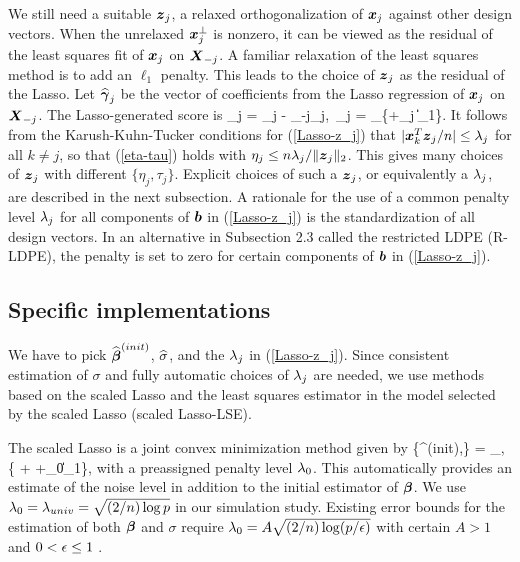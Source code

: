 \documentclass[11pt]{amsart}
\def\argmin{\mathop{\rm arg\, min}}
\begin{document}
We still need a suitable $\boldsymbol{z}_j$, a relaxed orthogonalization of $\boldsymbol{x}_j$ against other design vectors. 
When the unrelaxed $\boldsymbol{x}_j^\perp$ is nonzero, 
it can be viewed as the residual of the least squares fit of $\boldsymbol{x}_j$ on $\boldsymbol{X}_{-j}$. 
A familiar relaxation of the least squares method is to add an $\ell_1$ penalty. 
This leads to the choice of $\boldsymbol{z}_j$ as the residual of the Lasso.
Let ${\widehat{\boldsymbol{\gamma}}}_j$ be the vector of coefficients from the Lasso regression of $\boldsymbol{x}_j$ on $\boldsymbol{X}_{-j}$. 
The Lasso-generated score is 
\bz_j = \bx_j - \bX_{-j}\hbgamma_j,\ 
\hbgamma_j = \argmin_{\bb}\Big\{+\lam_j \|\bb\|_1\Big\}. 
\eel
It follows from the Karush-Kuhn-Tucker conditions for (\ref{Lasso-z_j}) that 
$|\boldsymbol{x}_k^T\boldsymbol{z}_j/n|\le\lambda_j$ for all $k \neq j$, 
so that (\ref{eta-tau}) holds with $\eta_j\le n\lambda_j/\|\boldsymbol{z}_j\|_2$. 
This gives many choices of $\boldsymbol{z}_j$ with different $\{\eta_j,\tau_j\}$. 
Explicit choices of such a $\boldsymbol{z}_j$, or equivalently a $\lambda_j$, are described in the next subsection. 
A rationale for the use of a common penalty level $\lambda_j$ for all components of $\boldsymbol{b}$ 
in (\ref{Lasso-z_j}) is the standardization of all design vectors. 
In an alternative in Subsection 2.3 called the restricted LDPE (R-LDPE), the penalty 
is set to zero for certain components of $\boldsymbol{b}$ in (\ref{Lasso-z_j}). 


\subsection{Specific implementations} 
We have to pick ${\widehat{\boldsymbol{\beta}}}^{(init)}$, $\widehat{\sigma}$, and the $\lambda_j$ in (\ref{Lasso-z_j}). 
Since consistent estimation of $\sigma$ and fully automatic choices of $\lambda_j$ are needed, 
we use methods based on the scaled Lasso and the least squares estimator 
in the model selected by the scaled Lasso ({scaled Lasso-LSE}). 

The scaled Lasso \cite{Antoniadis10,SunZ10,SunZ11} is a joint convex minimization method given by
\bel{scaled-Lasso}
\big\{\hbbeta^{(init)},\hsigma\big\} = \argmin_{\bb,\sigma}
\Big\{ + +\lam_0\|\bb\|_1\Big\},
\eel
with a preassigned penalty level $\lambda_0$. 
This automatically provides an estimate of the noise level in addition to the initial estimator of $\boldsymbol{\beta}$. 
We use $\lambda_0=\lambda_{univ}=\sqrt{(2/n)\log p}$ 
in our simulation study. 
Existing error bounds for the estimation of both $\boldsymbol{\beta}$ and $\sigma$ require 
$\lambda_0=A\sqrt{(2/n)\log(p/\epsilon)}$ with certain $A>1$ and $0<\epsilon\le 1$ \cite{SunZ11}. 
\end{document}
